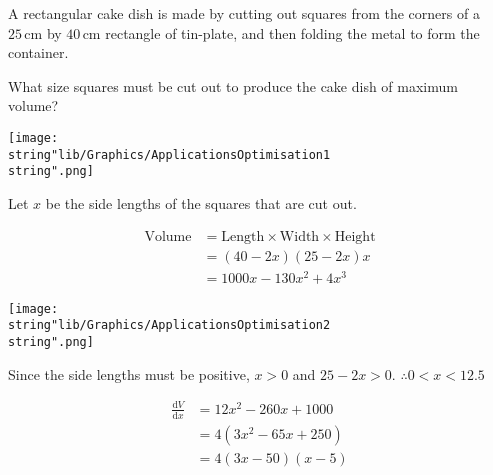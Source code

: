 \documentclass[11pt,a4paper]{book}
\begin{document}
\begin{example}

\begin{minipage}[t]{0.5\textwidth}

A rectangular cake dish is made by cutting out squares from the corners
of a $25\,\text{cm}$ by $40\,\text{cm}$ rectangle of tin-plate,
and then folding the metal to form the container.

What size squares must be cut out to produce the cake dish of maximum volume?

\end{minipage}
\begin{minipage}[t]{0.5\textwidth}
\begin{center}
\texttt{[image: \\string"lib/Graphics/ApplicationsOptimisation1\\string".png]}
\par\end{center}

\end{minipage}

\bigskip

\Solution

\begin{minipage}[t]{0.6\textwidth}

Let $x$ be the side lengths of the squares that are cut out.

\begin{align*}
\text{Volume} & =\text{Length}\times\text{Width}\times\text{Height}\\
 & =\left(40-2x\right)\left(25-2x\right)x\\
 & =1000x-130x^{2}+4x^{3}
\end{align*}

\end{minipage}
\begin{minipage}[t]{0.4\textwidth}
\begin{center}
\texttt{[image: \\string"lib/Graphics/ApplicationsOptimisation2\\string".png]}
\par\end{center}

\end{minipage}

Since the side lengths must be positive, $x>0$ and $25-2x>0$. $\therefore0<x<12.5$

\begin{align*}
\frac{{\mathrm{d}}V}{{\mathrm{d}}x} & =12x^{2}-260x+1000\\
 & =4\left(3x^{2}-65x+250\right)\\
 & =4\left(3x-50\right)\left(x-5\right)
\end{align*}


\end{example}
\end{document}
